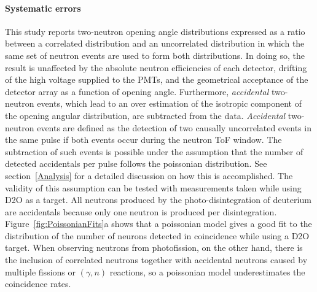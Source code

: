 \paragraph{Systematic errors}
This study reports two-neutron opening angle distributions expressed as a ratio between a correlated distribution and an uncorrelated distribution in which the same set of neutron events are used to form both distributions.
In doing so, the result is unaffected by the absolute neutron efficiencies of each detector, drifting of the high voltage supplied to the PMTs, and the geometrical acceptance of the detector array as a function of opening angle.
Furthermore, \textit{accidental} two-neutron events, which lead to an over estimation of the isotropic component of the opening angular distribution, are subtracted from the data.
\textit{Accidental} two-neutron events are defined as the detection of two causally uncorrelated events in the same pulse if both events occur during the neutron ToF window.
The subtraction of such events is possible under the assumption that the number of detected accidentals per pulse follows the poissonian distribution.
See section~\ref{Analysis} for a detailed discussion on how this is accomplished.
The validity of this assumption can be tested with measurements taken while using D2O as a target.
All neutrons produced by the photo-disintegration of deuterium are accidentals because only one neutron is produced per disintegration.
Figure~\ref{fig:PoissonianFits}a shows that a poissonian model gives a good fit to the distribution of the number of neurons detected in coincidence while using a D2O target.
When observing neutrons from photofission, on the other hand, there is the inclusion of correlated neutrons together with accidental neutrons caused by multiple fissions or $(\gamma, n)$ reactions, so a poissonian model underestimates the coincidence rates.
